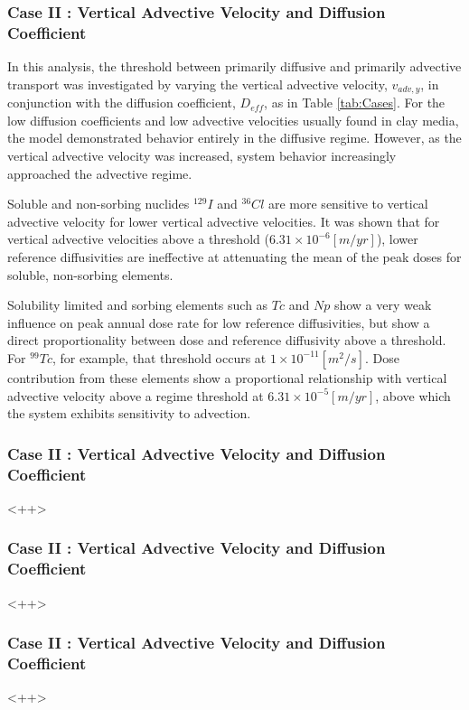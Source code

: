 

\begin{frame}[c]
  \frametitle{Case II : Vertical Advective Velocity and Diffusion Coefficient}
 
  In this analysis, the threshold between primarily diffusive and primarily 
  advective transport was investigated by varying the vertical advective 
  velocity, 
  $v_{adv,y}$, in conjunction with the diffusion coefficient, $D_{eff}$, as in 
  Table \ref{tab:Cases}.
  For the low diffusion coefficients and low advective 
  velocities usually found in clay media, the model demonstrated behavior 
  entirely 
  in the diffusive regime. However, as the vertical advective velocity was 
  increased, system behavior increasingly approached the advective regime. 

  Soluble and non-sorbing nuclides $^{129}I$ and 
  $^{36}Cl$ are more sensitive to vertical advective velocity for lower vertical 
  advective velocities. It was shown that for vertical advective velocities 
  above a threshold ($6.31\times10^{-6}[m/yr]$), lower reference diffusivities 
  are 
  ineffective at attenuating the mean of the peak doses for soluble, non-sorbing 
  elements. 

  Solubility limited and sorbing elements such as $Tc$ and $Np$ show a very weak 
  influence on peak annual dose rate for low reference diffusivities, but show a 
  direct proportionality between dose and reference diffusivity above a 
  threshold. 
  For $^{99}Tc$, for example, that threshold occurs at $1\times10^{-11}[m^2/s]$.  
  Dose contribution from these elements show a proportional 
  relationship with vertical advective velocity above a regime threshold at 
  $6.31\times10^{-5}[m/yr]$, above which the system exhibits sensitivity to 
  advection. 

\end{frame}

\begin{frame}[c]
  \frametitle{Case II : Vertical Advective Velocity and Diffusion Coefficient}
  <++>
\end{frame}

\begin{frame}[c]
  \frametitle{Case II : Vertical Advective Velocity and Diffusion Coefficient}
  <++>
\end{frame}

\begin{frame}[c]
  \frametitle{Case II : Vertical Advective Velocity and Diffusion Coefficient}
  <++>
\end{frame}
